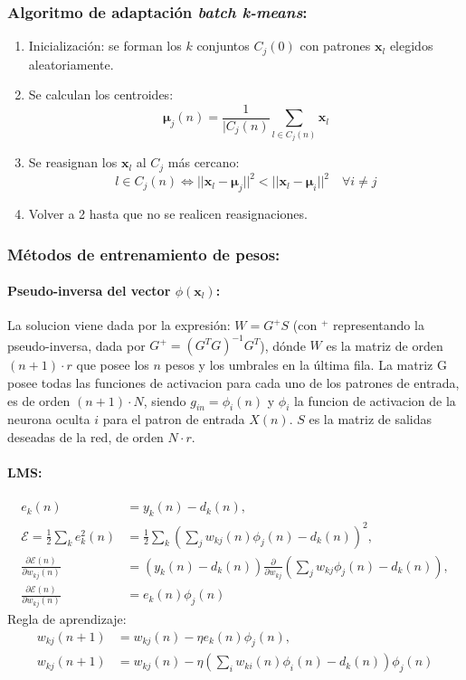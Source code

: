 \documentclass[10pt,a4paper]{article}
\begin{document}
\subsubsection{Algoritmo de adaptación \textit{batch k-means}:}
\begin{enumerate}
\item Inicialización: se forman los $k$ conjuntos $C_j(0)$ con patrones $\mathbf{x}_l$ elegidos aleatoriamente.
\item Se calculan los centroides:
\[\mathbf{\mu}_j(n) = \frac{1}{|C_j(n)}\sum_{l\in C_j(n)} \mathbf{x}_l\]
\item Se reasignan los $\mathbf{x}_l$ al $C_j$ más cercano:
\[ l \in C_j(n) \iff ||\mathbf{x}_l -\mathbf{\mu}_j||^2 < ||\mathbf{x}_l -\mathbf{\mu}_i||^2 \quad \forall i\neq j\]
\item Volver a 2 hasta que no se realicen reasignaciones.
\end{enumerate}

\subsubsection{Métodos de entrenamiento de pesos:}
\paragraph{Pseudo-inversa del vector $\phi(\mathbf{x}_l)$:} La solucion viene dada por la expresión: $W = G^{+} S$ (con $^+$ representando la pseudo-inversa, dada por $G^+=(G^T G)^{-1}G^T$), dónde $W$ es la matriz de orden $(n+1)\cdot r$ que posee los $n$ pesos y los umbrales en la última fila. La matriz G posee todas las funciones de activacion para cada uno de los patrones de entrada, es de orden $(n+1)\cdot N$, siendo $g_{in} = \phi_i(n)$ y $\phi_i$ la funcion de activacion de la neurona oculta $i$ para el patron de entrada $X(n)$. $S$ es la matriz de salidas deseadas de la red, de orden $N\cdot r$.

\paragraph{LMS:}
\begin{align*}
e_k(n) &= y_k(n)-d_k(n) ,\\
\mathcal{E} = \frac{1}{2} \sum_k e^2_k(n) &= \frac{1}{2} \sum_k \left(\sum_j w_{kj}(n)\phi_j(n)-d_k(n)\right)^2 ,\\
\frac{\partial \mathcal{E}(n)}{\partial w_{kj}(n)} &= (y_k(n) - d_k(n))\frac{\partial}{\partial w_{kj}} \left(\sum_j w_{kj} \phi_j(n) - d_k(n)\right), \\
\frac{\partial \mathcal{E}(n)}{\partial w_{kj}(n)} &= e_k(n) \phi_j(n)
\end{align*}
Regla de aprendizaje:
\begin{align*}
w_{kj}(n+1) &= w_{kj}(n) -\eta e_k(n) \phi_j(n) ,\\
w_{kj}(n+1) &= w_{kj}(n) -\eta \left(\sum_i w_{ki}(n) \phi_i(n) - d_k(n) \right) \phi_j(n)
\end{align*}
\end{document}
